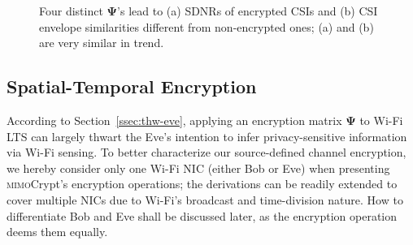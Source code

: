 \documentclass[conference,compsoc]{IEEEtran}
\newcommand{\sname}{\textsc{mimo}Crypt\xspace}
\newcommand{\newrev}[1]{{\color{blue}#1}}    %
\newcommand{\newrev}[1]{#1}
\begin{document}
\begin{figure}[b]
	\setlength\abovecaptionskip{6pt}
	\vspace{-1.5ex}
	\centering
	\vspace{.1ex}
	\caption{Four distinct $\bm{\Psi}$'s lead to
	(a) \newrev{SDNRs of encrypted CSIs} and (b) CSI envelope similarities different from non-encrypted ones; (a) and (b) are very similar in trend.}
	\label{fig:scramble_sdnr_sim}
	\vspace{-.5ex}
\end{figure}

\vspace{-.5ex}
\subsection{Spatial-Temporal Encryption}
\vspace{-1ex}
\label{ssec:scrambling}
%
According to 
Section~\ref{ssec:thw-eve}, applying an encryption matrix $\bm{\Psi}$ to Wi-Fi LTS can largely thwart the Eve's intention to infer privacy-sensitive information via Wi-Fi sensing. To better characterize our source-defined channel encryption,
we hereby consider only one Wi-Fi NIC (either Bob or Eve) when presenting \sname's 
encryption operations; the derivations can be readily extended to cover multiple NICs due to Wi-Fi's broadcast and time-division nature. How to differentiate Bob and Eve shall be discussed later, as the encryption operation deems them equally.
\end{document}
